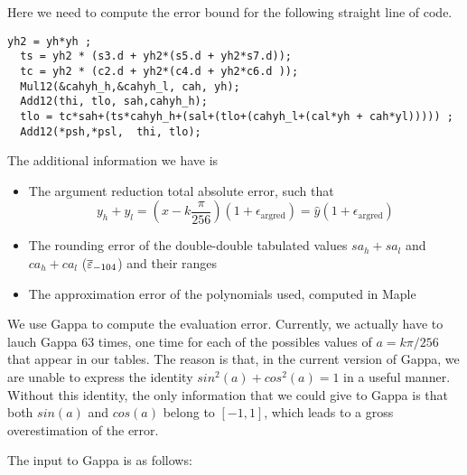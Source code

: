 Here we need to compute the error bound for the following straight line of
code.

\begin{lstlisting}[caption={DoSinNotZero},firstnumber=1]
  yh2 = yh*yh ;
  ts = yh2 * (s3.d + yh2*(s5.d + yh2*s7.d));	
  tc = yh2 * (c2.d + yh2*(c4.d + yh2*c6.d ));	
  Mul12(&cahyh_h,&cahyh_l, cah, yh);				       
  Add12(thi, tlo, sah,cahyh_h);					       
  tlo = tc*sah+(ts*cahyh_h+(sal+(tlo+(cahyh_l+(cal*yh + cah*yl))))) ;  
  Add12(*psh,*psl,  thi, tlo);	   			               
\end{lstlisting}

The additional information we have is 

\begin{itemize}

\item The argument reduction total absolute error, such that 
  \begin{equation}
    y_h+y_l = (x-k\frac{\pi}{256})(1+\epsilon_{\mathrm{argred}}) 
    = \hat{y}(1+\epsilon_{\mathrm{argred}})
  \end{equation}

\item The rounding error of the double-double tabulated values
  $sa_h+sa_l$ and  $ca_h+ca_l$  (${\overline{\varepsilon}}_{-104}$) and their ranges

\item The approximation error of the polynomials used, computed in
  Maple
\end{itemize}

We use Gappa to compute the evaluation error. Currently, we actually
have to lauch Gappa 63 times, one time for each of the possibles
values of $a=k\pi/256$ that appear in our tables. The reason is that,
in the current version of Gappa, we are unable to express the identity
$sin^2(a) + cos^2(a) = 1$ in a useful manner. Without this identity,
the only information that we could give to Gappa is that both $sin(a)$
and $cos(a)$ belong to $[-1,1]$, which leads to a gross overestimation of the error. 

The input to Gappa is as follows:


